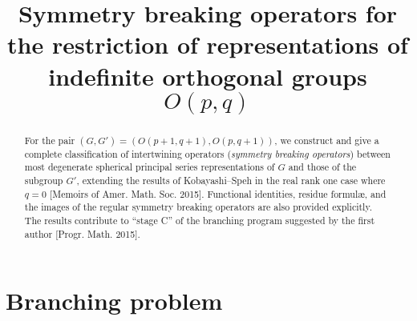 \documentclass[reqno,12pt]{pja00} %
\theoremstyle{definition}
\theoremstyle{exampstyle} \newtheorem{examp}[theorem]{Theorem}
\begin{document}
\title{Symmetry breaking operators for the restriction of representations of indefinite orthogonal groups $O(p,q)$}

  \maketitle
\begin{abstract}
	For the pair $(G, G') =(O(p+1, q+1), O(p,q+1))$, we construct and give a complete classification of intertwining operators (\textit{symmetry breaking operators})
	between
most degenerate spherical
principal series representations of 
$G$ and those of the subgroup $G'$, extending the results of Kobayashi--Speh in the real rank one case where $q=0$ 
 [Memoirs of Amer. Math. Soc. 2015].
Functional identities, residue formul\ae, and the images of the regular symmetry breaking operators are also provided 
explicitly.
The results contribute to ``stage C'' of the branching program suggested by the first author [Progr. Math. 2015].
\end{abstract}

\section{Branching problem}
\end{document}
